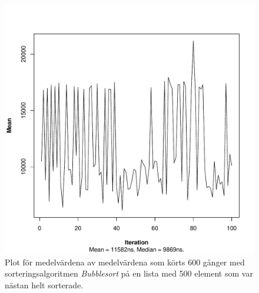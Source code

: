 \documentclass[a4paper]{article}
\begin{document}
\begin{figure}[H]
	\begin{center}
		\includegraphics[scale=0.4]{output/500/AlmostSorted/bubbleSort_almost_sorted_500_600_100.pdf}
		\caption{Plot för medelvärdena av medelvärdena som körts 600 gånger med sorteringsalgoritmen \emph{Bubblesort} på en lista med 500 element som var nästan helt sorterade.}
		\label{bubbleSort}
	\end{center}
\end{figure}
\end{document}
